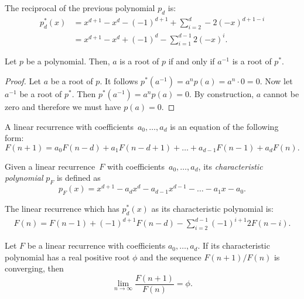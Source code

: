 \documentclass[english,version-2020-11]{uzl-thesis}
\begin{document}
\begin{example}
  The reciprocal of the previous polynomial $p_d$ is:
  \begin{align*}
    p_d^*(x) & = x^{d+1} - x^d - (-1)^{d+1} + \sum_{i = 2}^{d} -2 (-x)^{d + 1 - i} \\
             & = x^{d+1} - x^d + (-1)^d - \sum_{i = 1}^{d - 1} 2 (-x)^i.
  \end{align*}
\end{example}

\begin{lemma}
  Let $p$ be a polynomial. Then, $a$ is a root of $p$ if and only if $a^{-1}$ is a root of $p^*$.
\end{lemma}

\begin{proof}
  Let $a$ be a root of $p$. It follows $p^*(a^{-1}) = a^n p(a) = a^n \cdot 0 = 0$.
  Now let $a^{-1}$ be a root of $p^*$. Then $p^*(a^{-1}) = a^n p(a) = 0$.
  By construction, $a$ cannot be zero and therefore we must have $p(a) = 0$.
\end{proof}

\begin{definition}
  A linear recurrence with coefficients~$a_0, \dots, a_d$ is an equation of the
  following form:
  \[
    F(n + 1) = a_0 F(n - d) + a_1 F(n - d + 1) + \dots + a_{d-1} F(n - 1) + a_d F(n).
  \]
\end{definition}

\begin{definition}
  Given a linear recurrence~$F$ with coefficients~$a_0, \dots, a_d$, its
  \emph{characteristic polynomial} $p_F$ is defined as
  \[
    p_F(x) = x^{d+1} - a_d x^d - a_{d-1} x^{d-1} - \dots - a_1 x - a_0.
  \]
\end{definition}

\begin{example}
  The linear recurrence which has $p_d^*(x)$ as its characteristic polynomial is:
  \begin{align*}
    F(n) = F(n - 1) + (-1)^{d+1} F(n - d) - \sum_{i=2}^{d - 1} (-1)^{i+1} 2 F(n - i).
  \end{align*}
\end{example}

\begin{lemma}
  Let $F$ be a linear recurrence with coefficients $a_0, \dots, a_d$.
  If its characteristic polynomial has a real positive root $\phi$
  and the sequence $F(n+1)/F(n)$ is converging, then
  \[
    \lim_{n \to \infty} \frac{F(n + 1)}{F(n)} = \phi.
  \]
\end{lemma}
\end{document}
